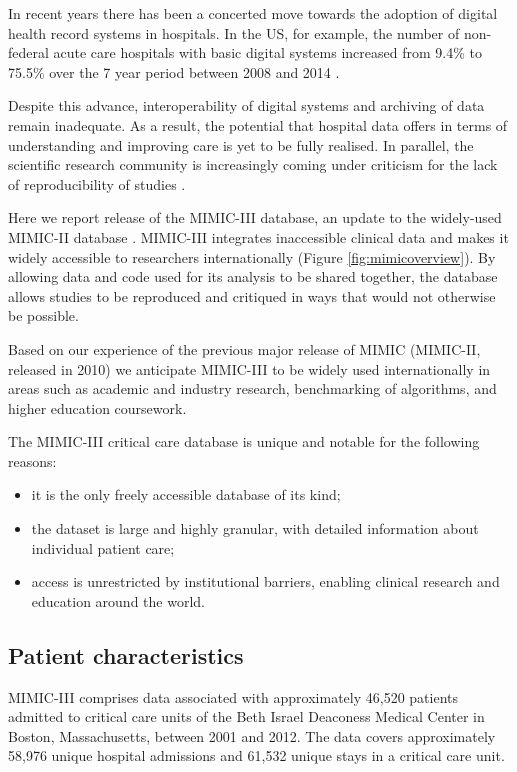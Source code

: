 \documentclass[english]{article}
\begin{document}
In recent years there has been a concerted move towards the adoption of digital health record systems in hospitals. In the US, for example, the number of non-federal acute care hospitals with basic digital systems increased from 9.4\% to 75.5\% over the 7 year period between 2008 and 2014 \cite{cite1}.

Despite this advance, interoperability of digital systems and archiving of data remain inadequate. As a result, the potential that hospital data offers in terms of understanding and improving care is yet to be fully realised. In parallel, the scientific research community is increasingly coming under criticism for the lack of reproducibility of studies \cite{cite2}.

Here we report release of the MIMIC-III database, an update to the widely-used MIMIC-II database \cite{cite3}. MIMIC-III integrates inaccessible clinical data and makes it widely accessible to researchers internationally (Figure \ref{fig:mimicoverview}). By allowing data and code used for its analysis to be shared together, the database allows studies to be reproduced and critiqued in ways that would not otherwise be possible. 

Based on our experience of the previous major release of MIMIC (MIMIC-II, released in 2010) we anticipate MIMIC-III to be widely used internationally in areas such as academic and industry research, benchmarking of algorithms, and higher education coursework.

The MIMIC-III critical care database is unique and notable for the following reasons: 
\begin{itemize}
  \item it is the only freely accessible database of its kind;
  \item the dataset is large and highly granular, with detailed information about individual patient care;
  \item access is unrestricted by institutional barriers, enabling clinical research and education around the world.
\end{itemize}

\subsection*{Patient characteristics}

MIMIC-III comprises data associated with approximately 46,520 patients admitted to critical care units of the Beth Israel Deaconess Medical Center in Boston, Massachusetts, between 2001 and 2012. The data covers approximately 58,976 unique hospital admissions and 61,532 unique stays in a critical care unit.
\end{document}
